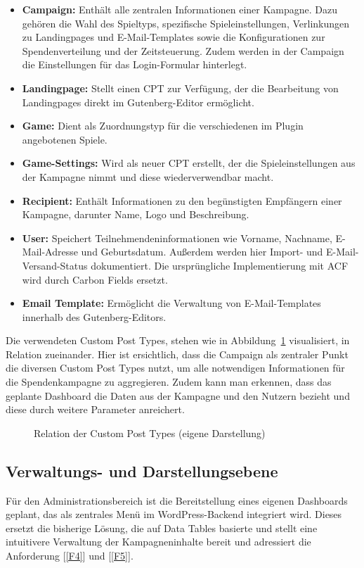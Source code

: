 \begin{itemize}
    \item \textbf{Campaign:} Enthält alle zentralen Informationen einer Kampagne.
    Dazu gehören die Wahl des Spieltyps, spezifische Spieleinstellungen, Verlinkungen zu Landingpages und E-Mail-Templates sowie die Konfigurationen zur Spendenverteilung und der Zeitsteuerung.
    Zudem werden in der Campaign die Einstellungen für das Login-Formular hinterlegt.

    \item \textbf{Landingpage:} Stellt einen CPT zur Verfügung, der die Bearbeitung von Landingpages direkt im Gutenberg-Editor ermöglicht.
    \item \textbf{Game:} Dient als Zuordnungstyp für die verschiedenen im Plugin angebotenen Spiele.
    \item \textbf{Game-Settings:} Wird als neuer CPT erstellt, der die Spieleinstellungen aus der Kampagne nimmt und diese wiederverwendbar macht.
    \item \textbf{Recipient:} Enthält Informationen zu den begünstigten Empfängern einer Kampagne, darunter Name, Logo und Beschreibung.
    \item \textbf{User:} Speichert Teilnehmendeninformationen wie Vorname, Nachname, E-Mail-Adresse und Geburtsdatum.
    Außerdem werden hier Import- und E-Mail-Versand-Status dokumentiert.
    Die ursprüngliche Implementierung mit ACF wird durch Carbon Fields ersetzt.
    \item \textbf{Email Template:} Ermöglicht die Verwaltung von E-Mail-Templates innerhalb des Gutenberg-Editors.
\end{itemize}

Die verwendeten Custom Post Types, stehen wie in Abbildung~\ref{fig:datenmodell} visualisiert, in Relation zueinander.
Hier ist ersichtlich, dass die Campaign als zentraler Punkt die diversen Custom Post Types nutzt, um alle notwendigen Informationen für die Spendenkampagne zu aggregieren.
Zudem kann man erkennen, dass das geplante Dashboard die Daten aus der Kampagne und den Nutzern bezieht und diese durch weitere Parameter anreichert.
\begin{figure}[H]
    \centering
    
    \caption{Relation der Custom Post Types (eigene Darstellung)}
    \label{fig:datenmodell}
\end{figure}


\subsection{Verwaltungs- und Darstellungsebene}
Für den Administrationsbereich ist die Bereitstellung eines eigenen Dashboards geplant, das als zentrales Menü im WordPress-Backend integriert wird.
Dieses ersetzt die bisherige Lösung, die auf Data Tables basierte und stellt eine intuitivere Verwaltung der Kampagneninhalte bereit und adressiert die Anforderung [\ref{F4}] und [\ref{F5}].

